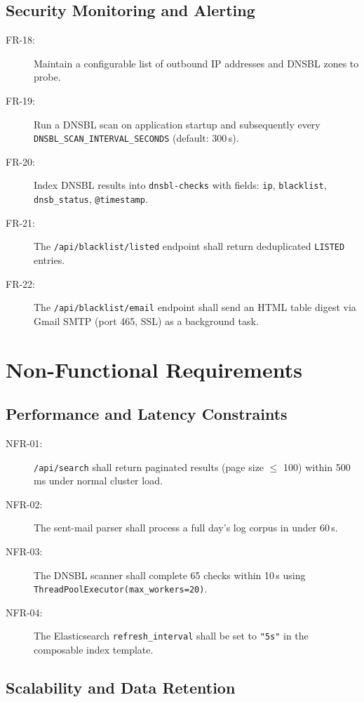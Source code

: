\documentclass[12pt,a4paper,oneside]{report}
\begin{document}
\subsection{Security Monitoring and Alerting}

\begin{description}
  \item[FR-18:] Maintain a configurable list of outbound IP addresses and DNSBL zones to probe.
  \item[FR-19:] Run a DNSBL scan on application startup and subsequently every \texttt{DNSBL\_SCAN\_INTERVAL\_SECONDS} (default: 300\,s).
  \item[FR-20:] Index DNSBL results into \texttt{dnsbl-checks} with fields: \texttt{ip}, \texttt{blacklist}, \texttt{dnsb\_status}, \texttt{@timestamp}.
  \item[FR-21:] The \texttt{/api/blacklist/listed} endpoint shall return deduplicated \texttt{LISTED} entries.
  \item[FR-22:] The \texttt{/api/blacklist/email} endpoint shall send an HTML table digest via Gmail SMTP (port 465, SSL) as a background task.
\end{description}

\section{Non-Functional Requirements}

\subsection{Performance and Latency Constraints}

\begin{description}
  \item[NFR-01:] \texttt{/api/search} shall return paginated results (page size $\leq$ 100) within 500\,ms under normal cluster load.
  \item[NFR-02:] The sent-mail parser shall process a full day's log corpus in under 60\,s.
  \item[NFR-03:] The DNSBL scanner shall complete 65 checks within 10\,s using \texttt{ThreadPoolExecutor(max\_workers=20)}.
  \item[NFR-04:] The Elasticsearch \texttt{refresh\_interval} shall be set to \texttt{"5s"} in the composable index template.
\end{description}

\subsection{Scalability and Data Retention}
\end{document}
